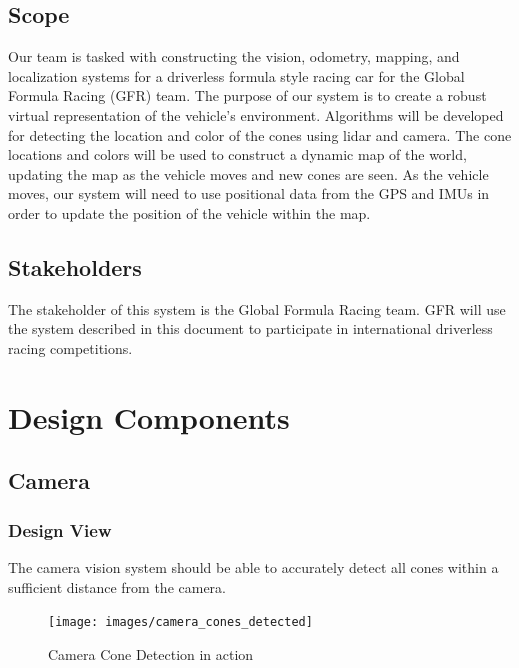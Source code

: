\documentclass[10pt, onecolumn, draftclsnofoot, letterpaper,compsoc]{IEEEtran}
\begin{document}
\subsection{Scope}
Our team is tasked with constructing the vision, odometry, mapping, and localization systems for a driverless formula style racing car for the Global Formula Racing (GFR) team. The purpose of our system is to create a robust virtual representation of the vehicle's environment. Algorithms will be developed for detecting the location and color of the cones using lidar and camera. The cone locations and colors will be used to construct a dynamic map of the world, updating the map as the vehicle moves and new cones are seen. As the vehicle moves, our system will need to use positional data from the GPS and IMUs in order to update the position of the vehicle within the map. 

\subsection{Stakeholders}
The stakeholder of this system is the Global Formula Racing team. GFR will use the system described in this document to participate in international driverless racing competitions.

\newpage
\section{Design Components}


\subsection{Camera}
\subsubsection{Design View} %

The camera vision system should be able to accurately detect all cones within a sufficient distance from the camera. 

\begin{figure}[H]
\centering
\label{fig:CameraExample}
\caption{Camera Cone Detection in action}
\texttt{[image: images/camera\_cones\_detected]}
\end{figure}
\end{document}
